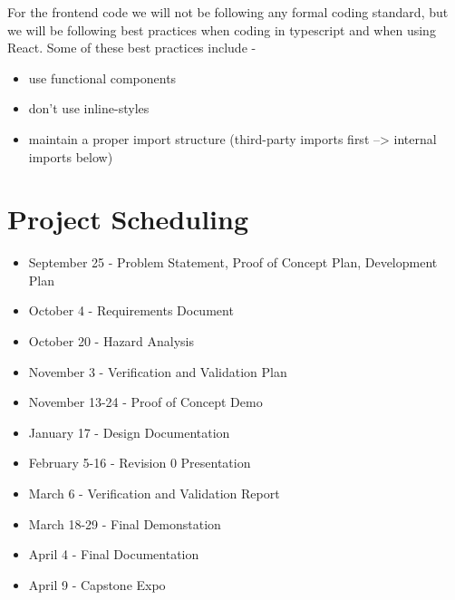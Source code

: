 \documentclass{article}
\begin{document}
For the frontend code we will not be following any formal coding standard, but we will be following best practices
when coding in typescript and when using React. Some of these best practices include - 

\begin{itemize}
	\item use functional components
	\item don't use inline-styles
	\item maintain a proper import structure (third-party imports first --> internal imports below)
\end{itemize}

\section{Project Scheduling}

\begin{itemize}
	\item September 25 - Problem Statement, Proof of Concept Plan, Development Plan
	\item October 4 - Requirements Document
	\item October 20 - Hazard Analysis
	\item November 3 - Verification and Validation Plan
	\item November 13-24 - Proof of Concept Demo
	\item January 17 - Design Documentation
	\item February 5-16 - Revision 0 Presentation
	\item March 6 - Verification and Validation Report
	\item March 18-29 - Final Demonstation
	\item April 4 - Final Documentation
	\item April 9 - Capstone Expo
\end {itemize}
\end{document}
